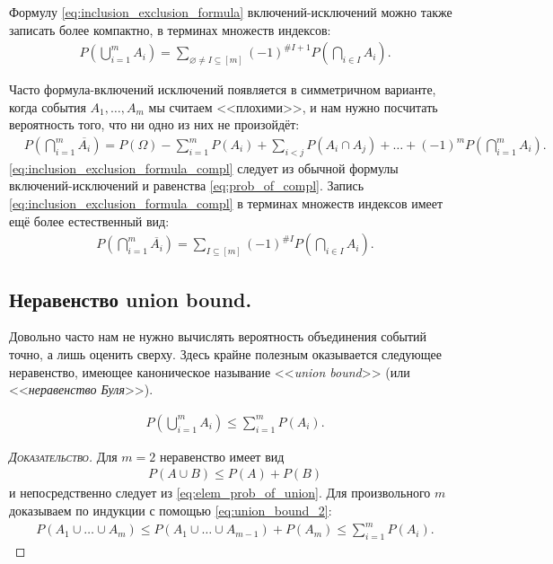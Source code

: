 \documentclass[../main.tex]{subfiles}
\begin{document}
Формулу \eqref{eq:inclusion_exclusion_formula} включений-исключений можно также записать более компактно, в терминах множеств индексов:
\begin{align*}
 P \left( \bigcup_{i=1}^{m} A_i \right) = \sum_{\varnothing \neq I \subseteq [m]} (-1)^{\# I + 1} P \left( \bigcap_{i \in I} A_i \right).
\end{align*}

Часто формула-включений исключений появляется в симметричном варианте, когда события $ A_1, \ldots, A_m $ мы считаем <<плохими>>, и нам нужно посчитать вероятность того, что ни одно из них не произойдёт:
\begin{align}
 \label{eq:inclusion_exclusion_formula_compl}
 &P \left( \bigcap_{i=1}^{m} \overline{A_i} \right) = P(\Omega) - \sum_{i=1}^{m}P(A_i) + \sum_{i < j} P(A_i \cap A_j) + \ldots + (-1)^{m} P \left( \bigcap_{i=1}^{m}A_i \right).
\end{align} \eqref{eq:inclusion_exclusion_formula_compl} следует из обычной формулы включений-исключений и равенства \eqref{eq:prob_of_compl}. Запись \eqref{eq:inclusion_exclusion_formula_compl} в терминах множеств индексов имеет ещё более естественный вид:
\begin{align*}
 P \left( \bigcap_{i=1}^{m}\overline{A_i} \right)=\sum_{I \subseteq [m]} (-1)^{\# I} P \left( \bigcap_{i \in I}A_i \right).
\end{align*}

\subsection{Неравенство union bound.}

Довольно часто нам не нужно вычислять вероятность объединения событий точно, а лишь оценить сверху. Здесь крайне полезным оказывается следующее неравенство, имеющее каноническое называние <<\textit{union bound}>> (или <<\textit{неравенство Буля}>>).

\begin{prop}
 \begin{align}
  \label{eq:union_bound}
  P \left( \bigcup_{i=1}^{m}A_i \right) \leqslant \sum_{i=1}^{m} P(A_i).
 \end{align}
\end{prop}
\begin{proof}[\normalfont\textsc{Доказательство}]
 Для $ m=2 $ неравенство имеет вид
 \begin{align}
  \label{eq:union_bound_2}
  P(A \cup B) \leqslant P(A) + P(B)
 \end{align} и непосредственно следует из \eqref{eq:elem_prob_of_union}. Для произвольного $ m $ доказываем по индукции с помощью \eqref{eq:union_bound_2}:
 \begin{align*}
  P(A_1 \cup \ldots \cup A_m) \leqslant P(A_1 \cup \ldots \cup A_{m-1}) + P(A_m) \leqslant \sum_{i=1}^{m} P(A_i).
 \end{align*}
\end{proof}
\end{document}
